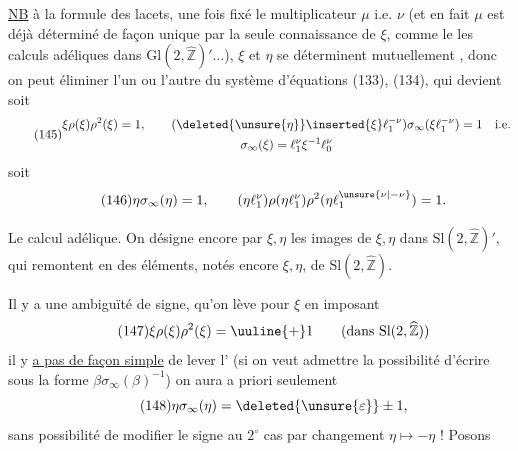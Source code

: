 \uline{NB}  à la formule des lacets, une fois fixé le multiplicateur $\mu$ i.e. $\nu$ (et en fait $\mu$ est déjà déterminé de façon unique par la seule connaissance de $\xi$, comme le  les calculs adéliques dans $\mathrm{Gl}(2,\widehat{\mathbb Z})'\ldots$), $\xi$ et $\eta$ se déterminent mutuellement , donc on peut éliminer l'un ou l'autre du système d'équations (133), (134), qui devient soit
\[
\tag{145}
\begin{gathered}
\xi\rho(\xi)\rho^2(\xi)=1,\qquad
(\deleted{\unsure{\eta}}\inserted{\xi}\ell_1^{-\nu})\sigma_\infty(\xi\ell_1^{-\nu})=1
\quad\text{i.e.}\\
\sigma_\infty(\xi)=\ell_1^\nu\xi^{-1}\ell_0^\nu
\end{gathered}
\]
soit
\[
\tag{146}
\eta\sigma_\infty(\eta)=1,\qquad
(\eta\ell_1^\nu)\rho(\eta\ell_1^\nu)\rho^2(\eta\ell_1^{\unsure{\nu|-\nu}})=1.
\]


Le calcul adélique. On désigne encore par $\xi,\eta$ les images de $\xi,\eta$ dans $\mathrm{Sl}(2,\widehat{\mathbb Z})'$, qui remontent en des éléments, notés encore $\xi,\eta$, de $\mathrm{Sl}(2,\widehat{\mathbb Z})$.

Il y a une ambiguïté de signe, qu'on lève pour $\xi$ en imposant
\[
\tag{147}
\xi\rho(\xi)\rho^2(\xi)=\uuline{+}1
\qquad(\text{dans }\mathrm{Sl}(2,\widehat{\mathbb Z}))
\]
 il y \uline{a pas de façon simple} de lever l' (si on veut admettre  la possibilité d'écrire sous la forme $\beta\sigma_\infty(\beta)^{-1}$) \uline{} on aura a priori seulement
\[
\tag{148}
\eta\sigma_\infty(\eta)=\deleted{\unsure{\varepsilon}}\pm1,
\]
sans possibilité de modifier le signe au $2^\circ$ cas par changement $\eta\mapsto-\eta$ ! Posons


